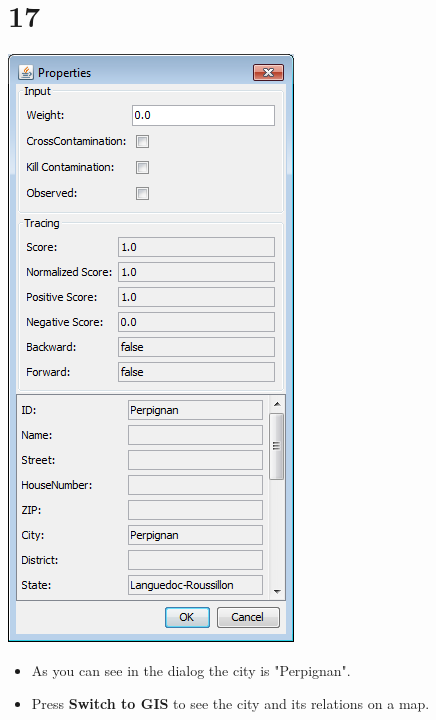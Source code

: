 \documentclass{beamer}
\begin{document}
\section{17}
\begin{frame}
	\begin{center}
  		\includegraphics[height=0.6\textheight]{17.png}
	\end{center}
	\begin{itemize}
		\item As you can see in the dialog the city is "Perpignan".
		\item Press \textbf{Switch to GIS} to see the city and its relations on a map.
	\end{itemize}
\end{frame}
\end{document}

